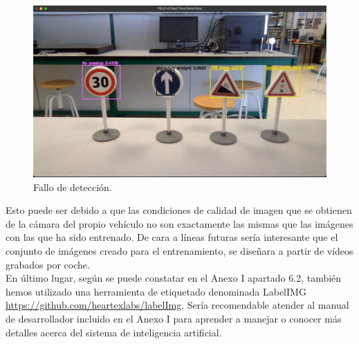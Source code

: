 \begin{figure}[H]
    \centering
 	\includegraphics[width=\textwidth]{Imagenes/IA/ejemplo_fallo.pdf}
    \caption{Fallo de detección.}
    \label{fallo}
\end{figure}

Esto puede ser debido a que las condiciones de calidad de imagen que se obtienen de la cámara del propio vehículo no son exactamente las mismas que las imágenes con las que ha sido entrenado. De cara a líneas futuras sería interesante que el conjunto de imágenes creado para el entrenamiento, se diseñara a partir de vídeos grabados por coche.\\

En último lugar, según se puede constatar en el Anexo I apartado 6.2, también hemos utilizado una herramienta de etiquetado denominada LabelIMG \url{https://github.com/heartexlabs/labelImg}. Sería recomendable atender al manual de desarrollador incluido en el Anexo I para aprender a manejar o conocer más detalles acerca del sistema de inteligencia artificial.


